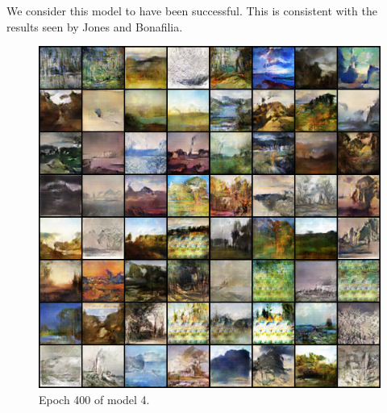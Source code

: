 \documentclass[11pt,letterpaper]{article}
\begin{document}
				We consider this model to have been successful.
				This is consistent with the results seen by Jones and Bonafilia\cite{otherGanGogh}.
				\begin{figure}
					\centering
					\includegraphics[width=1.0\linewidth]{results/model4/epoch400_generator}
					\caption{Epoch 400 of model 4.}
					\label{fig:wa64:epoch400generator}
				\end{figure}
\end{document}
